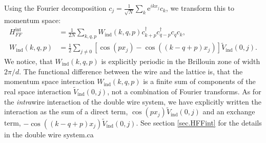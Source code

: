 Using the Fourier decomposition $c_j = \frac{1}{\sqrt{N}}\sum_k \text{e}^{ikx_j}c_k$, we transform this to momentum space:
\begin{align}
H^{\text{int}}_{FF} &= \frac{1}{2N} \sum_{k, q, p} W_{\text{ind}}(k, q, p) c^\dagger_{k + p} c^\dagger_{q - p} c_q c_k, \nonumber \\  
W_{\text{ind}}(k, q, p) &= \frac{1}{2}\sum_{j\neq 0} \left[\cos(px_j) - \cos((k - q + p)x_j) \right]\tilde{V}_{\text{ind}}(0, j). 
\label{eq.Hintmomentumspace.lattice}
\end{align}
We notice, that $W_{\text{ind}}(k, q, p)$ is explicitly periodic in the Brillouin zone of width $2\pi / d$. The functional difference between the wire and the lattice is, that the momentum space interaction $W_{\text{ind}}(k, q, p)$ is a finite sum of components of the real space interaction $\tilde{V}_{\text{ind}}(0, j)$, not a combination of Fourier transforms. As for the \textit{intra}wire interaction of the double wire system, we have explicitly written the interaction as the sum of a direct term, $\cos(px_j)\tilde{V}_{\text{ind}}(0, j)$ and an exchange term, $ - \cos((k - q + p)x_j)\tilde{V}_{\text{ind}}(0, j)$. See section \ref{sec.HFFint} for the details in the double wire system.ca


